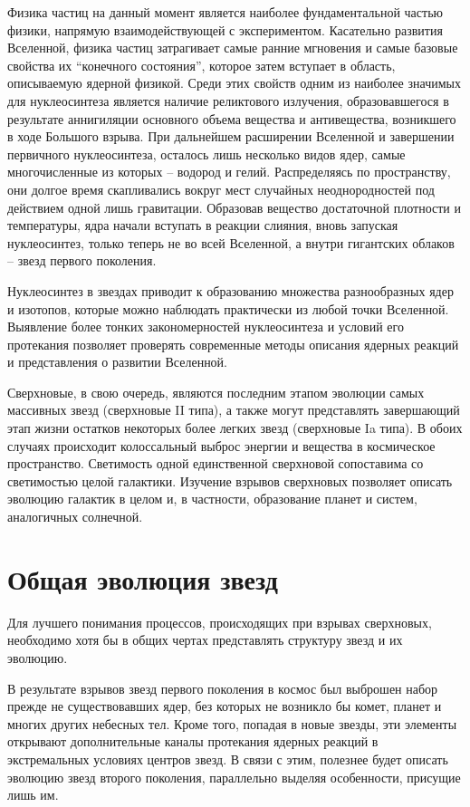 \documentclass[a4paper, 14pt]{extarticle}
\begin{document}
Физика частиц на данный момент является наиболее фундаментальной частью 
физики, напрямую взаимодействующей с экспериментом. Касательно развития 
Вселенной, физика частиц затрагивает самые ранние мгновения и самые 
базовые свойства их ``конечного состояния'', которое затем вступает 
в область, описываемую ядерной физикой. Среди этих свойств одним из 
наиболее значимых для нуклеосинтеза является наличие реликтового 
излучения, образовавшегося в результате аннигиляции основного объема 
вещества и антивещества, возникшего в ходе Большого взрыва. При 
дальнейшем расширении Вселенной и завершении первичного нуклеосинтеза, 
осталось лишь несколько видов ядер, самые многочисленные из которых -- 
водород и гелий. Распределяясь по пространству, они долгое время 
скапливались вокруг мест случайных неоднородностей под действием одной 
лишь гравитации. Образовав вещество достаточной плотности и температуры, 
ядра начали вступать в реакции слияния, вновь запуская нуклеосинтез, 
только теперь не во всей Вселенной, а внутри гигантских облаков -- 
звезд первого поколения.

Нуклеосинтез в звездах приводит к образованию множества разнообразных 
ядер и изотопов, которые можно наблюдать практически из любой точки 
Вселенной. Выявление более тонких закономерностей нуклеосинтеза 
и условий его протекания позволяет проверять современные методы описания 
ядерных реакций и представления о развитии Вселенной.

Сверхновые, в свою очередь, являются последним этапом эволюции самых 
массивных звезд (сверхновые II типа), а также могут представлять 
завершающий этап жизни остатков некоторых более легких звезд (сверхновые 
Ia типа). В обоих случаях происходит колоссальный выброс энергии 
и вещества в космическое пространство. Светимость одной единственной 
сверхновой сопоставима со светимостью целой галактики. Изучение взрывов 
сверхновых позволяет описать эволюцию галактик в целом и, в частности, 
образование планет и систем, аналогичных солнечной.


\section{Общая эволюция звезд}

Для лучшего понимания процессов, происходящих при взрывах сверхновых, 
необходимо хотя бы в общих чертах представлять структуру звезд и их 
эволюцию.

В результате взрывов звезд первого поколения в космос был выброшен набор 
прежде не существовавших ядер, без которых не возникло бы комет, планет 
и многих других небесных тел. Кроме того, попадая в новые звезды, эти 
элементы открывают дополнительные каналы протекания ядерных реакций 
в экстремальных условиях центров звезд. В связи с этим, полезнее будет 
описать эволюцию звезд второго поколения, параллельно выделяя 
особенности, присущие лишь им.
\end{document}
